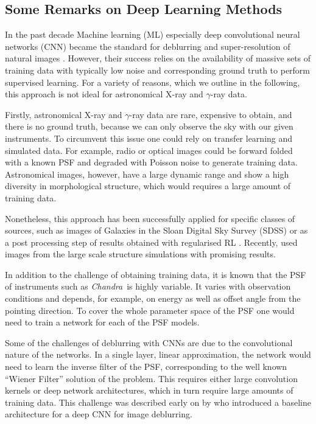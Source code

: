 \documentclass[twocolumn, lineno]{aastex631}
\newcommand{\chandra}{\textit{Chandra}~}
\newcommand{\gammaray}{$\gamma$-ray\xspace}
\newcommand{\xray}{X-ray\xspace}
\begin{document}
    \subsection{Some Remarks on Deep Learning Methods}
    In the past decade Machine learning (ML) especially deep convolutional neural networks (CNN) became the standard for deblurring and super-resolution of natural images \citep{Zhang2022}. However, their success relies on the availability of massive sets of training data with typically low noise and corresponding ground truth to perform supervised learning. For a variety of reasons, which we outline in the following, this approach is not ideal for astronomical \xray and \gammaray data.
    
    Firstly, astronomical \xray and \gammaray data are rare, expensive to obtain, and there is no ground truth, because we can only observe the sky with our given instruments. To circumvent this issue one could rely on transfer learning and simulated data. For example, radio or optical images could be forward folded with a known PSF and degraded with Poisson noise to generate training data.  Astronomical images, however, have a large dynamic range and show a high diversity in morphological structure, which would requires a large amount of training data.  

    Nonetheless, this approach has been successfully applied for specific classes of sources, such as images of Galaxies in the Sloan Digital Sky Survey (SDSS) \citep{Schawinski2017} or as a post processing step of results obtained with regularised RL \citep{Akhaury2022}. Recently, \cite{Sweere2022} used images from the large scale structure simulations with promising results.

    In addition to the challenge of obtaining training data, it is known that the PSF of instruments such as \chandra is highly variable. It varies with observation conditions and depends, for example, on energy as well as offset angle from the pointing direction. To cover the whole parameter space of the PSF one would need to train a network for each of the PSF models.

    Some of the challenges of deblurring with CNNs are due to the convolutional nature of the networks. In a single layer, linear approximation, the network would need to learn the inverse filter of the PSF, corresponding to the well known \enquote{Wiener Filter} solution of the problem. This requires either large convolution kernels or deep network architectures, which in turn require large amounts of training data. This challenge was described early on by \cite{Li2014} who introduced a baseline architecture for a deep CNN for image deblurring.
    
\end{document}
